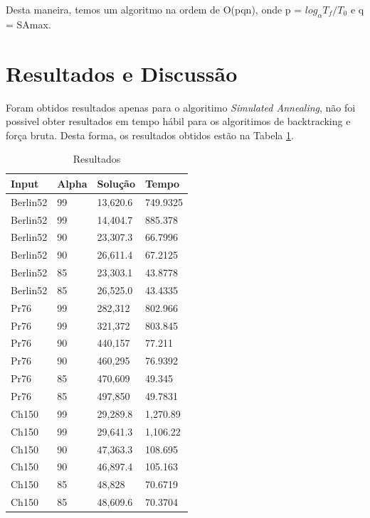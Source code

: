 \documentclass[a4paper, 12pt]{article}
\begin{document}
Desta maneira, temos um algoritmo na ordem de O(pqn), onde p = $log_\alpha T_f/T_0$ e q = SAmax.


\newpage
\section{Resultados e Discussão}

Foram obtidos resultados apenas para o algoritimo \textit{Simulated Annealing}, não foi possivel obter resultados em tempo hábil para os algoritimos de backtracking e força bruta. Desta forma, os resultados obtidos estão na Tabela \ref{tab:results}.

\begin{table}[h]
\centering
\begin{tabular}{| l | l | l | l |}
\hline
\textbf{Input} & \textbf{Alpha} & \textbf{Solução} & \textbf{Tempo} \\\hline
Berlin52 & 99 & 13,620.6 & 749.9325 \\\hline
Berlin52 & 99 & 14,404.7 & 885.378 \\\hline
Berlin52 & 90 & 23,307.3 & 66.7996 \\\hline
Berlin52 & 90 & 26,611.4 & 67.2125 \\\hline
Berlin52 & 85 & 23,303.1 & 43.8778 \\\hline
Berlin52 & 85 & 26,525.0 & 43.4335 \\\hline
Pr76     & 99 & 282,312  & 802.966 \\\hline
Pr76     & 99 & 321,372  & 803.845 \\\hline
Pr76     & 90 & 440,157  & 77.211 \\\hline
Pr76     & 90 & 460,295  & 76.9392 \\\hline
Pr76     & 85 & 470,609  & 49.345 \\\hline
Pr76     & 85 & 497,850  & 49.7831 \\\hline
Ch150    & 99 & 29,289.8 & 1,270.89 \\\hline
Ch150    & 99 & 29,641.3 & 1,106.22 \\\hline
Ch150    & 90 & 47,363.3 & 108.695 \\\hline
Ch150    & 90 & 46,897.4 & 105.163 \\\hline
Ch150    & 85 & 48,828   & 70.6719 \\\hline
Ch150    & 85 & 48,609.6 & 70.3704 \\\hline
\end{tabular}
  \caption{\label{tab:results}Resultados}
\end{table}
\end{document}
